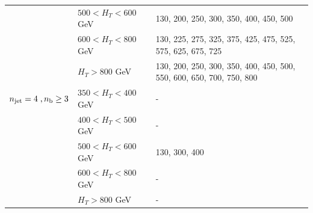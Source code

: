\begin{table}[h!]
\begin{tabular}{ lll }
     & $500 < H_{T} < 600$ GeV & 130, 200, 250, 300, 350, 400, 450, 500 \\ 
     & $600 < H_{T} < 800$ GeV & 130, 225, 275, 325, 375, 425, 475, 525, 575, 625, 675, 725 \\ 
     & $H_{T} > 800$ GeV & 130, 200, 250, 300, 350, 400, 450, 500, 550, 600, 650, 700, 750, 800 \\ 
    \hline
    $n_{\text{jet}} = 4 \;, n_{\text{b}} \geq 3$ & $350 < H_{T} < 400$ GeV & - \\ 
     & $400 < H_{T} < 500$ GeV & - \\ 
     & $500 < H_{T} < 600$ GeV & 130, 300, 400 \\ 
     & $600 < H_{T} < 800$ GeV & - \\ 
     & $H_{T} > 800$ GeV & - \\ 

  \end{tabular}
\end{table}



